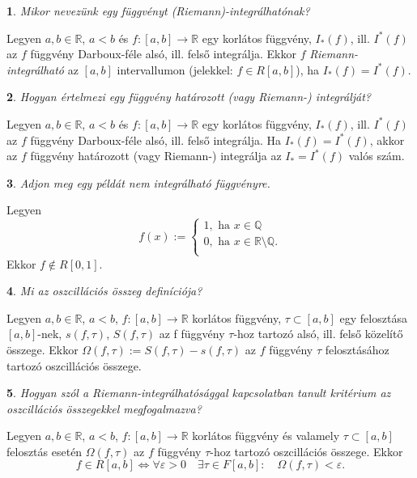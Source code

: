 \documentclass[a4paper]{article}
\def\Q{\mathbb{Q}}
\def\R{\mathbb{R}}
\theoremstyle{qstyle}
\newtheorem{question}{}{}
\begin{document}
	\begin{question}
		Mikor nevezünk egy függvényt (Riemann)-integrálhatónak?
	\end{question}
	Legyen $a,b \in \R$, $a < b$ és $f : [a,b] \to \R$ egy korlátos függvény, $I_*(f)$, ill. $I^*(f)$ az $f$ függvény Darboux-féle alsó, ill. felső integrálja. Ekkor $f$ \emph{Riemann-integrálható} az $[a,b]$ intervallumon (jelekkel: $f \in R[a,b]$), ha $I_*(f) = I^*(f)$.
	
	\begin{question}
		Hogyan értelmezi egy függvény határozott (vagy Riemann-) integrálját?
	\end{question}
	Legyen $a,b \in \R$, $a < b$ és $f : [a,b] \to \R$ egy korlátos függvény, $I_*(f)$, ill. $I^*(f)$ az $f$ függvény Darboux-féle alsó, ill. felső integrálja. Ha $I_*(f) = I^{*}(f)$, akkor az $f$ függvény határozott (vagy Riemann-) integrálja az $I_* = I^{*}(f)$ valós szám.
	
	\begin{question}
		Adjon meg egy példát \emph{nem integrálható} függvényre. 
	\end{question}
	Legyen
	$$
	f(x) := 
	\begin{cases}
	1, \text{ ha } x \in \Q \\
	0, \text{ ha } x \in \R \setminus \Q \text{.} \\
	\end{cases}
	$$
	Ekkor $f \notin R[0,1]$.
	
	\begin{question}
		Mi az \emph{oszcillációs összeg} definíciója? 
	\end{question}
	Legyen $a, b \in \R$, $a < b$, $f : [a,b] \to \R$ korlátos függvény, $\tau \subset [a,b]$ egy felosztása $[a,b]$-nek, $s(f,\tau)$, $S(f,\tau)$ az f függvény $\tau$-hoz tartozó alsó, ill. felső közelítő összege. Ekkor $\Omega(f,\tau) := S(f,\tau) - s(f,\tau)$ az $f$ függvény $\tau$ felosztásához tartozó oszcillációs összege.
	
	\begin{question}
		Hogyan szól a Riemann-integrálhatósággal kapcsolatban tanult kritérium az oszcillációs
		összegekkel megfogalmazva?  
	\end{question}
	Legyen $a, b \in \R$, $a < b$, $f : [a,b] \to \R$ korlátos függvény és valamely $\tau \subset [a,b]$ felosztás esetén $\Omega(f,\tau)$ az $f$ függvény $\tau$-hoz tartozó oszcillációs összege. Ekkor
	$$
	f \in R[a,b] \Longleftrightarrow \forall \varepsilon > 0 \quad \exists\tau \in F[a,b]: \quad \Omega(f,\tau) < \varepsilon \text{.}
	$$
	
\end{document}
